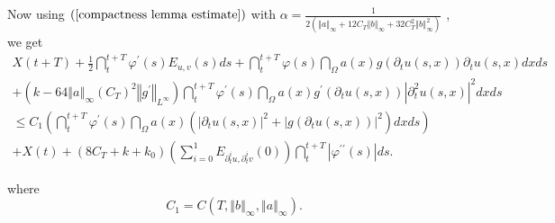 \documentclass[11pt,reqno]{amsart}
\theoremstyle{plain}
\numberwithin{equation}{section}
\numberwithin{equation}{section}
\begin{document}
Now using $\left( \ref{compactness lemma estimate}\right) $ with $\alpha =%
\frac{1}{2\left( \left\Vert a\right\Vert _{\infty }+12C_{T}\left\Vert
b\right\Vert _{\infty }+32C_{T}^{2}\left\Vert b\right\Vert _{\infty
}^{2}\right) }$ , we get%
\begin{equation}
\begin{array}{l}
X\left( t+T\right) +\frac{1}{2}\dint_{t}^{t+T}\varphi ^{\prime }\left(
s\right) E_{u,v}\left( s\right) ds+\dint_{t}^{t+T}\varphi \left( s\right)
\dint_{\Omega }a\left( x\right) g\left( \partial _{t}u\left( s,x\right)
\right) \partial _{t}u\left( s,x\right) dxds \\ 
+\left( k-64\left\Vert a\right\Vert _{\infty }\left( C_{T}\right)
^{2}\left\Vert g^{\prime }\right\Vert _{L^{\infty }}\right)
\dint_{t}^{t+T}\varphi ^{\prime }\left( s\right) \dint_{\Omega }a\left(
x\right) g^{\prime }\left( \partial _{t}u\left( s,x\right) \right)
\left\vert \partial _{t}^{2}u\left( s,x\right) \right\vert ^{2}dxds \\ 
\leq C_{1}\left( \dint_{t}^{t+T}\varphi ^{\prime }\left( s\right)
\dint_{\Omega }a\left( x\right) \left( \left\vert \partial _{t}u\left(
s,x\right) \right\vert ^{2}+\left\vert g\left( \partial _{t}u\left(
s,x\right) \right) \right\vert ^{2}\right) dxds\right) \\ 
+X\left( t\right) +\left( 8C_{T}+k+k_{0}\right) \left(
\sum_{i=0}^{1}E_{\partial _{t}^{i}u,\partial _{t}^{i}v}\left( 0\right)
\right) \dint_{t}^{t+T}\left\vert \varphi ^{\prime \prime }\left( s\right)
\right\vert ds.%
\end{array}
\label{proof theorem Xt final estimate1}
\end{equation}

where%
\begin{equation}
C_{1}=C\left( T,\left\Vert b\right\Vert _{\infty },\left\Vert a\right\Vert
_{\infty }\right) .  \label{C1 definition}
\end{equation}
\end{document}
